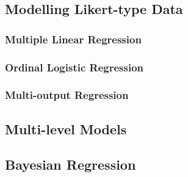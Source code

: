  \subsection{Modelling Likert-type Data}

   \subsubsection{Multiple Linear Regression}

   \subsubsection{Ordinal Logistic Regression}

   \subsubsection{Multi-output Regression}

 \subsection{Multi-level Models}

 \subsection{Bayesian Regression}

